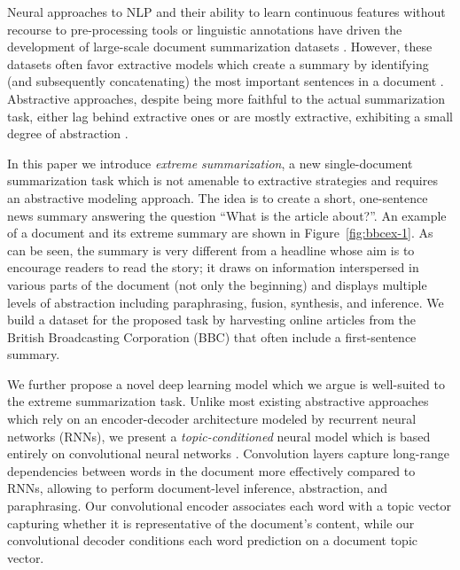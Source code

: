 \documentclass[11pt,a4paper]{article}
\begin{document}
Neural approaches to NLP and their ability to learn continuous
features without recourse to pre-processing tools or linguistic
annotations have driven the development of large-scale document
summarization datasets
\cite{nytcorpus,hermann-nips15,newsroom-naacl18}.
However, these datasets often favor extractive models which create a
summary by identifying (and subsequently concatenating) the most
important sentences in a document
\cite{jp-acl16,nallapati17,narayan-rank18}.  Abstractive approaches,
despite being more faithful to the actual summarization task, either
lag behind extractive ones or are mostly extractive, exhibiting a
small degree of abstraction
\cite{see-acl17,tanwan-acl17,paulus-socher-arxiv17,Pasunuru-multireward18,asli-multiagent18}.


In this paper we introduce \emph{extreme summarization}, a new
single-document summarization task which is not amenable to extractive
strategies and requires an abstractive modeling approach. The idea is
to create a short, one-sentence news summary answering the question
``What is the article about?''. An example of a document and its
extreme summary are shown in Figure~\ref{fig:bbcex-1}. As can be seen,
the summary is very different from a headline whose aim is to
encourage readers to read the story; it draws on information
interspersed in various parts of the document (not only the beginning)
and displays multiple levels of abstraction including paraphrasing,
fusion, synthesis, and inference. We build a dataset for the proposed
task by harvesting online articles from the British Broadcasting
Corporation (BBC) that often include a first-sentence summary.











We further propose a novel deep learning model which we argue is
well-suited to the extreme summarization task. Unlike most existing
abstractive approaches
\cite{rush-acl15,chenIjcai-16,nallapati-signll16,see-acl17,tanwan-acl17,paulus-socher-arxiv17,Pasunuru-multireward18,asli-multiagent18}
which rely on an encoder-decoder architecture modeled by recurrent
neural networks (RNNs), we present a \emph{topic-conditioned} neural
model which is based entirely on convolutional neural networks
\cite{convseq2seq}. Convolution layers capture long-range
dependencies between words in the document more effectively compared to
RNNs, allowing to perform document-level inference, abstraction, and
paraphrasing.  Our convolutional encoder associates each word with a
topic vector capturing whether it is representative of the document's
content, while our convolutional decoder conditions each word
prediction on a document topic vector.
\end{document}
